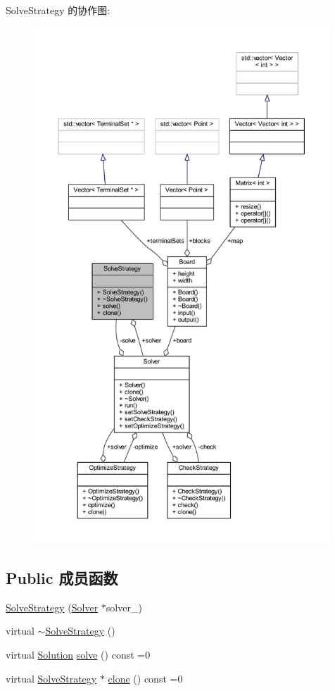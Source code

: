 Solve\+Strategy 的协作图\+:
\nopagebreak
\begin{figure}[H]
\begin{center}
\leavevmode
\includegraphics[height=550pt]{classSolveStrategy__coll__graph}
\end{center}
\end{figure}
\subsection*{Public 成员函数}
\begin{DoxyCompactItemize}
\item 
\hyperlink{classSolveStrategy_adae0995ba06bc3bd6d79b08f7a0677b7}{Solve\+Strategy} (\hyperlink{classSolver}{Solver} $\ast$solver\+\_\+)
\item 
virtual \hyperlink{classSolveStrategy_ade3d76ea14e2b9b838a63d3431ad3752}{$\sim$\+Solve\+Strategy} ()
\item 
virtual \hyperlink{classSolution}{Solution} \hyperlink{classSolveStrategy_ad3c3800be3e04570b466c3d8d054c500}{solve} () const  =0
\item 
virtual \hyperlink{classSolveStrategy}{Solve\+Strategy} $\ast$ \hyperlink{classSolveStrategy_a49d51ab69b0c47648638819c2f61f247}{clone} () const  =0
\end{DoxyCompactItemize}
